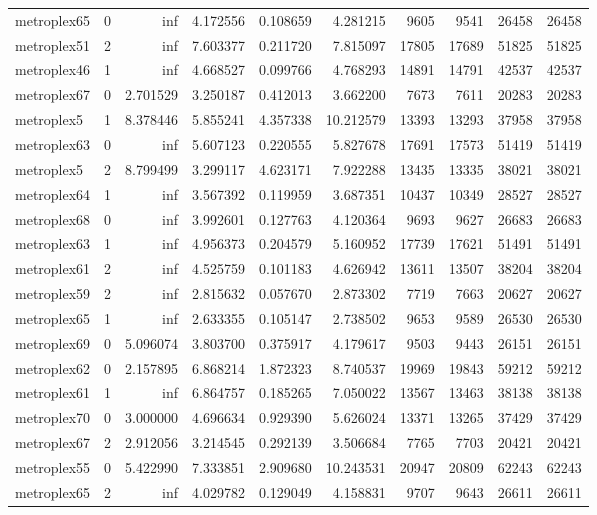 \begin{longtable}{|l|r|r|r|r|r|r|r|r|r|}
metroplex65 & 0 & inf & 4.172556 & 0.108659 & 4.281215 & 9605 & 9541 & 26458 & 26458 \\
metroplex51 & 2 & inf & 7.603377 & 0.211720 & 7.815097 & 17805 & 17689 & 51825 & 51825 \\
metroplex46 & 1 & inf & 4.668527 & 0.099766 & 4.768293 & 14891 & 14791 & 42537 & 42537 \\
metroplex67 & 0 & 2.701529 & 3.250187 & 0.412013 & 3.662200 & 7673 & 7611 & 20283 & 20283 \\
metroplex5 & 1 & 8.378446 & 5.855241 & 4.357338 & 10.212579 & 13393 & 13293 & 37958 & 37958 \\
metroplex63 & 0 & inf & 5.607123 & 0.220555 & 5.827678 & 17691 & 17573 & 51419 & 51419 \\
metroplex5 & 2 & 8.799499 & 3.299117 & 4.623171 & 7.922288 & 13435 & 13335 & 38021 & 38021 \\
metroplex64 & 1 & inf & 3.567392 & 0.119959 & 3.687351 & 10437 & 10349 & 28527 & 28527 \\
metroplex68 & 0 & inf & 3.992601 & 0.127763 & 4.120364 & 9693 & 9627 & 26683 & 26683 \\
metroplex63 & 1 & inf & 4.956373 & 0.204579 & 5.160952 & 17739 & 17621 & 51491 & 51491 \\
metroplex61 & 2 & inf & 4.525759 & 0.101183 & 4.626942 & 13611 & 13507 & 38204 & 38204 \\
metroplex59 & 2 & inf & 2.815632 & 0.057670 & 2.873302 & 7719 & 7663 & 20627 & 20627 \\
metroplex65 & 1 & inf & 2.633355 & 0.105147 & 2.738502 & 9653 & 9589 & 26530 & 26530 \\
metroplex69 & 0 & 5.096074 & 3.803700 & 0.375917 & 4.179617 & 9503 & 9443 & 26151 & 26151 \\
metroplex62 & 0 & 2.157895 & 6.868214 & 1.872323 & 8.740537 & 19969 & 19843 & 59212 & 59212 \\
metroplex61 & 1 & inf & 6.864757 & 0.185265 & 7.050022 & 13567 & 13463 & 38138 & 38138 \\
metroplex70 & 0 & 3.000000 & 4.696634 & 0.929390 & 5.626024 & 13371 & 13265 & 37429 & 37429 \\
metroplex67 & 2 & 2.912056 & 3.214545 & 0.292139 & 3.506684 & 7765 & 7703 & 20421 & 20421 \\
metroplex55 & 0 & 5.422990 & 7.333851 & 2.909680 & 10.243531 & 20947 & 20809 & 62243 & 62243 \\
metroplex65 & 2 & inf & 4.029782 & 0.129049 & 4.158831 & 9707 & 9643 & 26611 & 26611 \\

\end{longtable}

